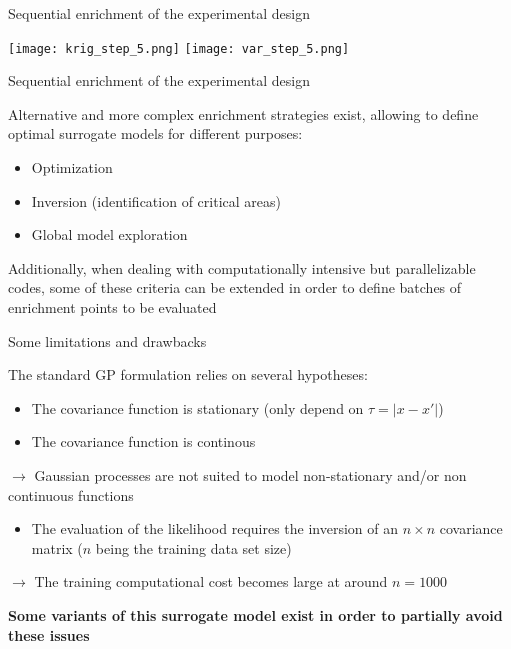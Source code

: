 \documentclass[9pt]{beamer}
\begin{document}
\begin{frame}{Sequential enrichment of the experimental design}

\begin{center}
\texttt{[image: krig\_step\_5.png]}
\texttt{[image: var\_step\_5.png]}
\end{center}


\end{frame}


\begin{frame}{Sequential enrichment of the experimental design}

Alternative and more complex enrichment strategies exist, allowing to define optimal surrogate models for different purposes:

\begin{itemize}
\item Optimization
\item Inversion (identification of critical areas)
\item Global model exploration 
\end{itemize}

\vspace{10pt}

Additionally, when dealing with computationally intensive but parallelizable codes, some of these criteria can be extended in order to define batches of enrichment points to be evaluated


\end{frame}


\begin{frame}{Some limitations and drawbacks}

The standard GP formulation relies on several hypotheses:

\begin{itemize}
\item The covariance function is stationary (only depend on $\tau = |x-x'|$)
\item The covariance function is continous
\end{itemize}
$\rightarrow$ Gaussian processes are not suited to model non-stationary and/or non continuous functions

\vspace{10pt}

\begin{itemize}
\item The evaluation of the likelihood requires the inversion of an $n \times n$ covariance matrix ($n$ being the training data set size) 
\end{itemize}
$\rightarrow$ The training computational cost becomes large at around $n = 1000$

\vspace{10pt}

\textbf{Some variants of this surrogate model exist in order to partially avoid these issues}
\end{frame}
\end{document}
